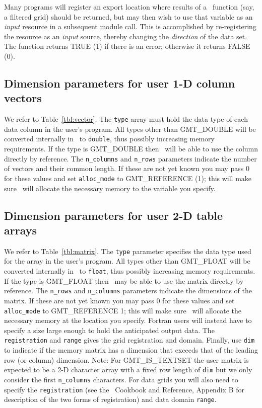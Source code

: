 \documentclass[11pt]{report}
\begin{document}
Many programs will register an export location where results of a \GMT\ function (say,
a filtered grid) should be returned, but may then wish to use that variable as an \emph{input}
resource in a subsequent module call.  This is accomplished by re-registering the resource
as an \emph{input} source, thereby changing the \emph{direction} of the data set.
The function returns TRUE (1) if there is an error; otherwise it returns FALSE (0).

\subsection{Dimension parameters for user 1-D column vectors}
We refer to Table~\ref{tbl:vector}.  The \texttt{type} array must hold the
data type of each data column in the user's program.  All types other than GMT\_DOUBLE will
be converted internally in \GMT\ to \texttt{double}, thus possibly increasing memory requirements.
If the type is GMT\_DOUBLE then \GMT\ will be able to use the column directly by reference.  The \texttt{n\_columns}
and \texttt{n\_rows} parameters indicate the number of vectors and their common length.  If these
are not yet known you may pass 0 for these values
and set \texttt{alloc\_mode} to GMT\_REFERENCE (1); this will make
sure \GMT\ will allocate the necessary memory to the variable you specify.

\subsection{Dimension parameters for user 2-D table arrays}

We refer to Table~\ref{tbl:matrix}.  The \texttt{type} parameter specifies the
data type used for the array in the user's program.  All types other than GMT\_FLOAT will
be converted internally in \GMT\ to \texttt{float}, thus possibly increasing memory requirements.
If the type is GMT\_FLOAT then \GMT\ may be able to use the matrix directly by reference.  The \texttt{n\_rows}
and \texttt{n\_columns} parameters indicate the dimensions of the matrix.  If these
are not yet known you may pass 0 for these values and set \texttt{alloc\_mode} to GMT\_REFERENCE 1; this will make
sure \GMT\ will allocate the necessary memory at the location you specify.  Fortran users
will instead have to specify a size large enough to hold the anticipated output data.
The \texttt{registration} and \texttt{range} gives the grid registration and domain.
Finally, use \texttt{dim} to indicate if the memory matrix has a dimension that
exceeds that of the leading row (or column) dimension. Note: For GMT\_IS\_TEXTSET
the user matrix is expected to be a 2-D character array with a fixed row length of \texttt{dim}
but we only consider the first \texttt{n\_columns} characters.  For data grids you will
also need to specify the \texttt{registration}  (see the \GMT\ Cookbook and Reference,
Appendix B for description of the two forms of registration) and data domain \texttt{range}.
\end{document}
